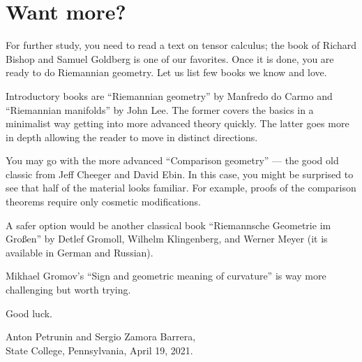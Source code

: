 \chapter*{Want more?}



For further study, you need to read a text on tensor calculus;
the book of Richard Bishop and Samuel Goldberg \cite{bishop-goldberg} is one of our favorites.
Once it is done, you are ready to do Riemannian geometry.
Let us list few books we know and love.

Introductory books are ``Riemannian geometry'' \cite{carmo1992riemannian} by Manfredo do Carmo and ``Riemannian manifolds''  \cite{lee2006riemannian} by John Lee.
The former covers the basics in a minimalist way getting into more advanced theory quickly.
The latter goes more in depth allowing the reader to move in distinct directions.

You may go with the more advanced ``Comparison geometry'' \cite{cheeger-ebin} --- the good old classic from Jeff Cheeger and David Ebin. 
In this case, you might be surprised to see that half of the material looks familiar.
For example, proofs of the comparison theorems require only cosmetic modifications.

A safer option would be another classical book ``Riemannsche Geometrie im Großen'' \cite{gromoll-klingenberg-meyer} by 
Detlef Gromoll,
Wilhelm Klingenberg, 
and  Werner Meyer (it is available in German and Russian).

Mikhael Gromov's ``Sign and geometric meaning of curvature'' \cite{gromov-1991} is way more challenging but worth trying.

Good luck.

\begin{flushright}
Anton Petrunin and Sergio Zamora Barrera,\\
State College, Pennsylvania, April 19, 2021.
\end{flushright}
